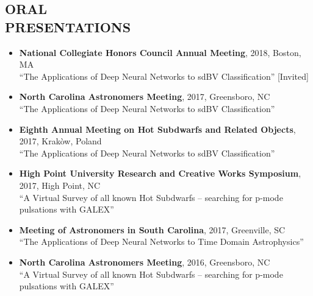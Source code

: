 \documentclass[margin, 10pt]{res} %
\begin{document}
\begin{resume}
\section{ORAL\\PRESENTATIONS}
\begin{itemize}
\item {\scriptsize \textbf{National Collegiate Honors Council Annual Meeting}}, {\small 2018, Boston, MA}\\ ``The Applications of Deep Neural Networks to sdBV Classification'' {\footnotesize [Invited]}
\item {\scriptsize \textbf{North Carolina Astronomers Meeting}}, {\small 2017, Greensboro, NC}\\ ``The Applications of Deep Neural Networks to sdBV Classification''
\item {\scriptsize \textbf{Eighth Annual Meeting on Hot Subdwarfs and Related Objects}}, {\small 2017, Krak\`ow, Poland}\\ ``The Applications of Deep Neural Networks to sdBV Classification''
\item {\scriptsize \textbf{High Point University Research and Creative Works Symposium}}, {\small 2017, High Point, NC}\\ ``A Virtual Survey of all known Hot Subdwarfs -- searching for p-mode pulsations with GALEX''
\item \textbf{{\scriptsize Meeting of Astronomers in South Carolina}}, {\small 2017, Greenville, SC}\\``The Applications of Deep Neural Networks to Time Domain Astrophysics''
\item {\scriptsize \textbf{North Carolina Astronomers Meeting}}, {\small 2016, Greensboro, NC}\\``A Virtual Survey of all known Hot Subdwarfs -- searching for p-mode pulsations with GALEX''
\end{itemize}


\end{resume}
\end{document}
